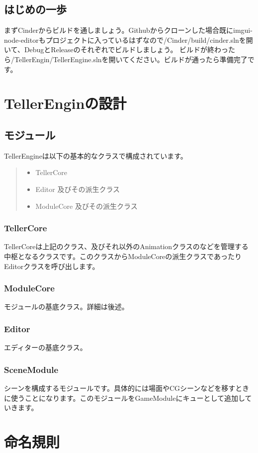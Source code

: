 \documentclass[12pt,a4paper,uplatex,dvipdfmx]{jsarticle}
\begin{document}
\subsection{はじめの一歩}
まずCinderからビルドを通しましょう。Githubからクローンした場合既にimgui-node-editorもプロジェクトに入っているはずなので/Cinder/build/cinder.slnを開いて、DebugとReleaseのそれぞれでビルドしましょう。
ビルドが終わったら/TellerEngin/TellerEngine.slnを開いてください。ビルドが通ったら準備完了です。
\section{TellerEnginの設計}
\subsection{モジュール}
TellerEngineは以下の基本的なクラスで構成されています。
\begin{quote}
  \begin{itemize}
    \item TellerCore
    \item Editor 及びその派生クラス
    \item ModuleCore 及びその派生クラス
  \end{itemize}
\end{quote}
\subsubsection{TellerCore}
TellerCoreは上記のクラス、及びそれ以外のAnimationクラスのなどを管理する中枢となるクラスです。このクラスからModuleCoreの派生クラスであったりEditorクラスを呼び出します。
\subsubsection{ModuleCore}
モジュールの基底クラス。詳細は後述。
\subsubsection{Editor}
エディターの基底クラス。

\subsubsection{SceneModule}
シーンを構成するモジュールです。具体的には場面やCGシーンなどを移すときに使うことになります。このモジュールをGameModuleにキューとして追加していきます。


\section{命名規則}
\end{document}
